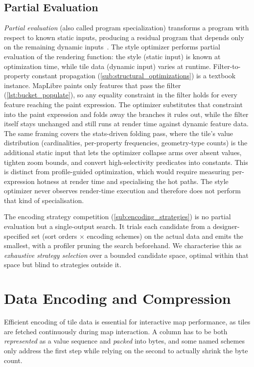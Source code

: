 \subsection{Partial Evaluation}\label{sub:partial_eval}

\emph{Partial evaluation} (also called program specialization) transforms a program with respect to known static inputs, producing a residual program that depends only on the remaining dynamic inputs~\cite{jonesPartialEvaluationAutomatic1993}.
The style optimizer performs partial evaluation of the rendering function: the style (static input) is known at optimization time, while tile data (dynamic input) varies at runtime.
Filter-to-property constant propagation (\cref{sub:structural_optimizations}) is a textbook instance.
MapLibre paints only features that pass the filter (\cref{lst:bucket_populate}), so any equality constraint in the filter holds for every feature reaching the paint expression.
The optimizer substitutes that constraint into the paint expression and folds away the branches it rules out, while the filter itself stays unchanged and still runs at render time against dynamic feature data.
The same framing covers the stats-driven folding pass, where the tile's value distribution (cardinalities, per-property frequencies, geometry-type counts) is the additional static input that lets the optimizer collapse  arms over absent values, tighten zoom bounds, and convert high-selectivity predicates into constants.
This is distinct from profile-guided optimization, which would require measuring per-expression hotness at render time and specialising the hot paths.
The style optimizer never observes render-time execution and therefore does not perform that kind of specialisation.

The encoding strategy competition (\cref{sub:encoding_strategies}) is no partial evaluation but a single-output search.
It trials each candidate from a designer-specified set (sort orders $\times$ encoding schemes) on the actual data and emits the smallest, with a profiler pruning the search beforehand.
We characterise this as \emph{exhaustive strategy selection} over a bounded candidate space, optimal within that space but blind to strategies outside it.

\section{Data Encoding and Compression}\label{sec:data_encoding}

Efficient encoding of tile data is essential for interactive map performance, as tiles are fetched continuously during map interaction.
A column has to be both \emph{represented} as a value sequence and \emph{packed} into bytes, and some named schemes only address the first step while relying on the second to actually shrink the byte count.

